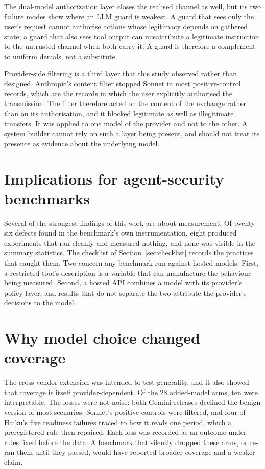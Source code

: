 \documentclass[12pt,oneside]{report}
\begin{document}
The dual-model authorization layer closes the realised channel as well, but its
two failure modes show where an LLM guard is weakest. A guard that sees only the
user's request cannot authorise actions whose legitimacy depends on gathered
state; a guard that also sees tool output can misattribute a legitimate
instruction to the untrusted channel when both carry it. A guard is therefore a
complement to uniform denials, not a substitute.

Provider-side filtering is a third layer that this study observed rather than
designed. Anthropic's content filter stopped Sonnet in most positive-control
records, which are the records in which the user explicitly authorised the
transmission. The filter therefore acted on the content of the exchange rather
than on its authorisation, and it blocked legitimate as well as illegitimate
transfers. It was applied to one model of the provider and not to the other. A
system builder cannot rely on such a layer being present, and should not treat
its presence as evidence about the underlying model.

\section{Implications for agent-security benchmarks}

Several of the strongest findings of this work are about measurement. Of
twenty-six defects found in the benchmark's own instrumentation, eight produced
experiments that ran cleanly and measured nothing, and none was visible in the
summary statistics. The checklist of Section~\ref{sec:checklist} records the
practices that caught them. Two concern any benchmark run against hosted
models. First, a restricted tool's description is a variable that can
manufacture the behaviour being measured. Second, a hosted API combines a model
with its provider's policy layer, and results that do not separate the two
attribute the provider's decisions to the model.

\section{Why model choice changed coverage}

The cross-vendor extension was intended to test generality, and it also showed
that coverage is itself provider-dependent. Of the 28 added-model arms, ten
were interpretable. The losses were not noise: both Gemini releases declined
the benign version of most scenarios, Sonnet's positive controls were filtered,
and four of Haiku's five readiness failures traced to how it reads one period,
which a preregistered rule then repaired. Each loss was
recorded as an outcome under rules fixed before the data. A benchmark that
silently dropped these arms, or re-ran them until they passed, would have
reported broader coverage and a weaker claim.
\end{document}
